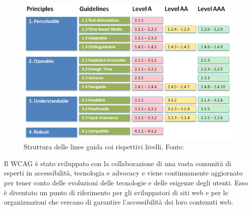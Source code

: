 \documentclass[a4paper,final,12pt]{report}
\begin{document}
\begin{figure}[hbtp]
\centering
\includegraphics[scale=0.43]{img_concettuale/wcag.png}
\caption{Struttura delle linee guida coi rispettivi livelli, Fonte: \cite{antonio}}
\label{figura:lineeguidalivelliacc}
\end{figure}

Il WCAG è stato sviluppato con la collaborazione di una vasta comunità di esperti in accessibilità, tecnologia e advocacy e viene continuamente aggiornato per tener conto delle evoluzioni delle tecnologie e delle esigenze degli utenti. Esso è diventato un punto di riferimento per gli sviluppatori di siti web e per le organizzazioni che cercano di garantire l'accessibilità dei loro contenuti web.
\end{document}
